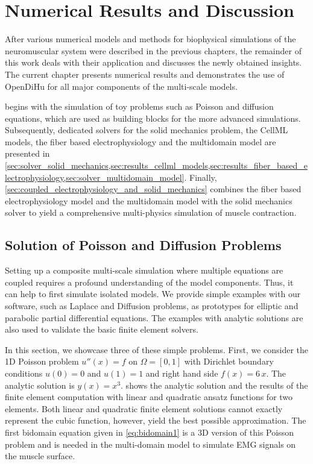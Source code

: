 \chapter{Numerical Results and Discussion}\label{sec:results}

After various numerical models and methods for biophysical simulations of the neuromuscular system were described in the previous chapters, the remainder of this work deals with their application and discusses the newly obtained insights.
The current chapter presents numerical results and demonstrates the use of OpenDiHu for all major components of the multi-scale models. 

 begins with the simulation of toy problems such as Poisson and diffusion equations, which are used as building blocks for the more advanced simulations. Subsequently, dedicated solvers for the solid mechanics problem, the CellML models, the fiber based electrophysiology and the multidomain model are presented in \cref{sec:solver_solid_mechanics,sec:results_cellml_models,sec:results_fiber_based_electrophysiology,sec:solver_multidomain_model}. Finally, \cref{sec:coupled_electrophysiology_and_solid_mechanics} combines the fiber based electrophysiology model and the multidomain model with the solid mechanics solver to yield a comprehensive multi-physics simulation of muscle contraction.


\section{Solution of Poisson and Diffusion Problems}\label{sec:poisson_diffusion}

Setting up a composite multi-scale simulation where multiple equations are coupled requires a profound understanding of the model components. 
Thus, it can help to first simulate isolated models. We provide simple examples with our software, such as Laplace and Diffusion problems, as prototypes for elliptic and parabolic partial differential equations. The examples with analytic solutions are also used to validate the basic finite element solvers.

In this section, we showcase three of these simple problems. First, we consider the 1D Poisson problem $u''(x) = f$ on $\Omega=[0,1]$ with Dirichlet boundary conditions $u(0)=0$ and $u(1)=1$ and right hand side $f(x)=6\,x$. The analytic solution is $y(x)=x^3$.  shows the analytic solution and the results of the finite element computation with linear and quadratic ansatz functions for two elements. Both linear and quadratic finite element solutions cannot exactly represent the cubic function, however, yield the best possible approximation. 
The first bidomain equation given in \cref{eq:bidomain1} is a 3D version of this Poisson problem and is needed in the multi-domain model to simulate EMG signals on the muscle surface.


